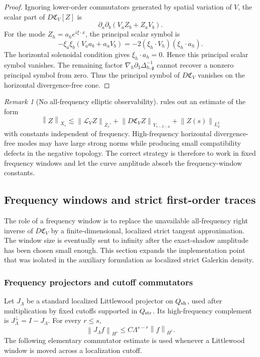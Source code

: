 \documentclass[11pt]{article}
\numberwithin{equation}{section}
\theoremstyle{plain}
\theoremstyle{definition}
\theoremstyle{remark}
\newtheorem{remark}{Remark}[section]
\newcommand{\nabh}{\nabla_h}
\newcommand{\norm}[2]{\left\|#1\right\|_{#2}}
\newcommand{\calC}{\mathfrak C}
\begin{document}
\begin{proof}
Ignoring lower-order commutators generated by spatial variation of \(V\), the scalar
part of \(D\calC_V[Z]\) is
\[
        \partial_a\partial_b(V_aZ_b+Z_aV_b).
\]
For the mode \(Z_h=a_he^{i\xi\cdot x}\), the principal scalar symbol is
\[
        -\xi_a\xi_b(V_a a_b+a_aV_b)
        =-2(\xi_h\cdot V_h)(\xi_h\cdot a_h).
\]
The horizontal solenoidal condition gives \(\xi_h\cdot a_h=0\).  Hence this principal
scalar symbol vanishes.  The remaining factor
\(\nabh\partial_3\Delta_{h,\mathfrak g}^{-1}\) cannot recover a nonzero principal symbol from zero.
Thus the principal symbol of \(D\calC_V\) vanishes on the horizontal divergence-free
cone.
\end{proof}

\begin{remark}[No all-frequency elliptic observability]\label{pIV:rem:no-elliptic}
 rules out an estimate of the form
\[
        \norm{Z}{X_s}
        \lesssim
        \norm{\mathcal L_VZ}{Z_s'}+\norm{D\calC_VZ}{Y_{s-2-a}}
        +\norm{Z(s)}{L^2_\phi}
\]
with constants independent of frequency.  High-frequency horizontal divergence-free
modes may have large strong norms while producing small compatibility defects in the
negative topology.  The correct strategy is therefore to work in fixed frequency
windows and let the curve amplitude absorb the frequency-window constants.
\end{remark}


\subsection{Frequency windows and strict first-order traces}\label{pIV:sec:freq}

The role of a frequency window is to replace the unavailable all-frequency right
inverse of \(D\calC_V\) by a finite-dimensional, localized strict tangent
approximation.  The window size is eventually sent to infinity after the
exact-shadow amplitude has been chosen small enough.  This section expands the
implementation point that was isolated in the auxiliary formulation as localized strict
Galerkin density.

\subsubsection{Frequency projectors and cutoff commutators}

Let \(J_\Lambda\) be a standard localized Littlewood projector on \(Q_{\rm sh}\),
used after multiplication by fixed cutoffs supported in \(Q_{\rm str}\).  Its
high-frequency complement is \(J_\Lambda^\perp=I-J_\Lambda\).  For every \(r\le s\),
\begin{equation}\label{pIV:eq:bernstein}
        \norm{J_\Lambda f}{H^s}
        \le C\Lambda^{s-r}\norm{f}{H^r}.
\end{equation}
The following elementary commutator estimate is used whenever a Littlewood window is
moved across a localization cutoff.
\end{document}
